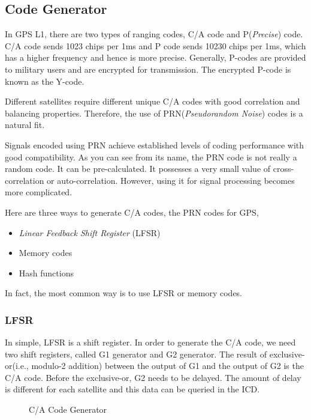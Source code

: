 \subsection{Code Generator}
In GPS L1, there are two types of ranging codes, C/A code and P(\textit{Precise}) code. C/A code sends \num{1023} chips per 1ms and P code sends \num{10230} chips per 1ms, which has a higher frequency and hence is more precise. Generally, P-codes are provided to military users and are encrypted for transmission. The encrypted P-code is known as the Y-code\cite{RN195}.

Different satellites require different unique C/A codes with good correlation and balancing properties. Therefore, the use of PRN(\textit{Pseudorandom Noise}) codes is a natural fit\cite{RN197}.

Signals encoded using PRN achieve established levels of coding performance with good compatibility. As you can see from its name, the PRN code is not really a random code. It can be pre-calculated. It possesses a very small value of cross-correlation or auto-correlation. However, using it for signal processing becomes more complicated\cite{RN200}.

Here are three ways to generate C/A codes\cite{RN196}, the PRN codes for GPS,
\begin{itemize}
    \item \textit{Linear Feedback Shift Register} (LFSR)
    \item Memory codes
    \item Hash functions
\end{itemize}
In fact, the most common way is to use LFSR or memory codes. 

\subsubsection{LFSR}
In simple, LFSR is a shift register. In order to generate the C/A code, we need two shift registers, called G1 generator and G2 generator. The result of exclusive-or(i.e., modulo-2 addition) between the output of G1 and the output of G2 is the C/A code. Before the exclusive-or, G2 needs to be delayed. The amount of delay is different for each satellite and this data can be queried in the ICD.

\begin{figure}[!htbp]
    \centering
    
    \caption{C/A Code Generator}
    \label{fig:ca_gen}
\end{figure}

